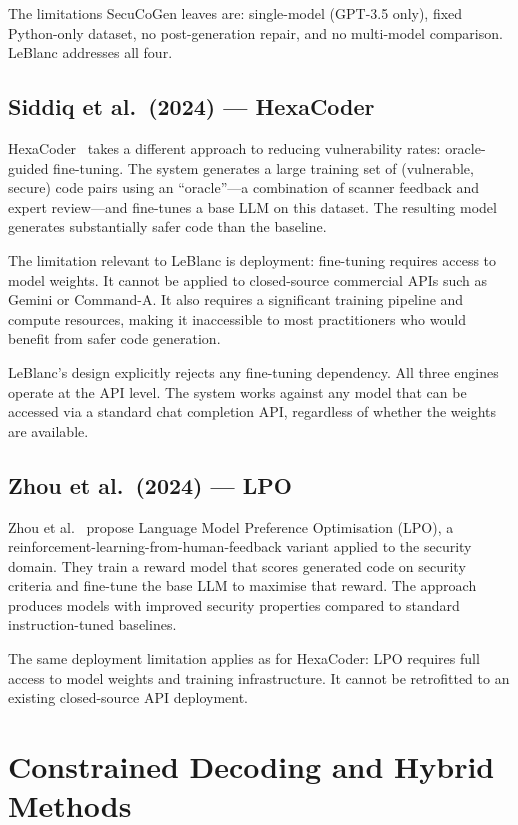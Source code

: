 \documentclass[12pt,a4paper]{report}
\begin{document}
The limitations SecuCoGen leaves are: single-model (GPT-3.5 only), fixed
Python-only dataset, no post-generation repair, and no multi-model comparison.
LeBlanc addresses all four.

\subsection{Siddiq et al.\ (2024) --- HexaCoder}
\label{ssec:hexacoder}

HexaCoder~\cite{hexacoder2024} takes a different approach to reducing
vulnerability rates: oracle-guided fine-tuning. The system generates a large
training set of (vulnerable, secure) code pairs using an ``oracle''---a
combination of scanner feedback and expert review---and fine-tunes a base LLM on
this dataset. The resulting model generates substantially safer code than the
baseline.

The limitation relevant to LeBlanc is deployment: fine-tuning requires access
to model weights. It cannot be applied to closed-source commercial APIs such as
Gemini or Command-A. It also requires a significant training pipeline and compute
resources, making it inaccessible to most practitioners who would benefit from
safer code generation.

LeBlanc's design explicitly rejects any fine-tuning dependency. All three engines
operate at the API level. The system works against any model that can be accessed
via a standard chat completion API, regardless of whether the weights are
available.

\subsection{Zhou et al.\ (2024) --- LPO}
\label{ssec:lpo}

Zhou et al.~\cite{lpo2024} propose Language Model Preference Optimisation (LPO),
a reinforcement-learning-from-human-feedback variant applied to the security
domain. They train a reward model that scores generated code on security criteria
and fine-tune the base LLM to maximise that reward. The approach produces models
with improved security properties compared to standard instruction-tuned baselines.

The same deployment limitation applies as for HexaCoder: LPO requires full
access to model weights and training infrastructure. It cannot be retrofitted to
an existing closed-source API deployment.

\section{Constrained Decoding and Hybrid Methods}
\label{sec:litconstrained}
\end{document}
